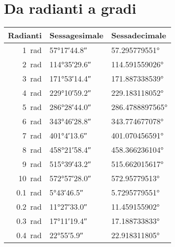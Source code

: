 \section{Da radianti a gradi}
\begin{center}
	\begin{tabular}{rll}
		\toprule
		Radianti & Sessagesimale & Sessadecimale \\ 
		\midrule
		\SI{1}{\radian}	&\ang{57;17;44.8}  &\ang[round-precision=\lungarrotandamento,round-mode=places]{57.295779551}  \\ 
		\SI{2}{\radian}	&\ang{114;35;29.6}  &\ang[round-precision=\lungarrotandamento,round-mode=places]{114.591559026}  \\ 
		\SI{3}{\radian}	&\ang{171;53;14.4}  &\ang[round-precision=\lungarrotandamento,round-mode=places]{171.887338539}  \\ 
		\SI{4}{\radian}	&\ang{229;10;59.2}  &\ang[round-precision=\lungarrotandamento,round-mode=places]{229.183118052}  \\ 
		\SI{5}{\radian}	&\ang{286;28;44.0}  &\ang[round-precision=\lungarrotandamento,round-mode=places]{286.4788897565}  \\
		\SI{6}{\radian}	&\ang{343;46;28.8}  &\ang[round-precision=\lungarrotandamento,round-mode=places]{343.774677078}  \\  
		\SI{7}{\radian}	&\ang{401;4;13.6}  &\ang[round-precision=\lungarrotandamento,round-mode=places]{401.070456591}  \\ 
		\SI{8}{\radian}	&\ang{458;21;58.4}  &\ang[round-precision=\lungarrotandamento,round-mode=places]{458.366236104}  \\ 
		\SI{9}{\radian}	&\ang{515;39;43.2}  &\ang[round-precision=\lungarrotandamento,round-mode=places]{515.662015617}  \\ 
		\SI{10}{\radian}	&\ang{572;57;28.0}  &\ang[round-precision=\lungarrotandamento,round-mode=places]{572.95779513}  \\ 
		\midrule
		\SI{0.1}{\radian}	&\ang{5;43;46.5}  &\ang[round-precision=\lungarrotandamento,round-mode=places]{5.7295779551}  \\
		\SI{0.2}{\radian}	&\ang{11;27;33.0}  &\ang[round-precision=\lungarrotandamento,round-mode=places]{11.459155902}  \\
		\SI{0.3}{\radian}	&\ang{17;11;19.4}  &\ang[round-precision=\lungarrotandamento,round-mode=places]{17.188733833}  \\
		\SI{0.4}{\radian}	&\ang{22;55;5.9}  &\ang[round-precision=\lungarrotandamento,round-mode=places]{22.918311805}  \\

\end{tabular}
\end{center}
